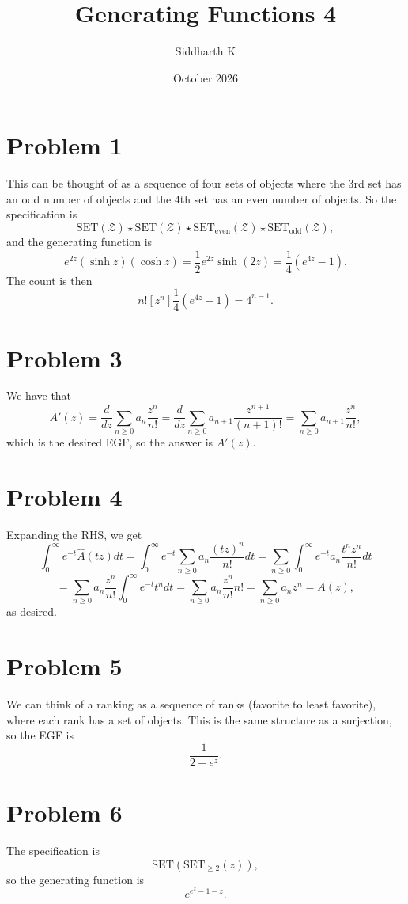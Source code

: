 \documentclass{article}
\title{Generating Functions 4}
\author{Siddharth K}
\date{October 2026}
\newcommand{\mcZ}{\mathcal{Z}}
\newcommand{\set}{\mathrm{SET}}
\begin{document}
\maketitle

\section*{Problem 1}
This can be thought of as a sequence of four sets of objects where the 3rd set has an odd number of objects and the 4th set has an even number of objects. So the specification is
$$\set(\mcZ) \star \set(\mcZ) \star \set_{\text{even}}(\mcZ) \star \set_{\text{odd}}(\mcZ),$$
and the generating function is
$$e^{2z}(\sinh z)(\cosh z) = \frac{1}{2}e^{2z}\sinh(2z) = \frac{1}{4}(e^{4z} - 1).$$
The count is then
$$n![z^n]\frac{1}{4}(e^{4z} - 1) = 4^{n - 1}.$$

\section*{Problem 3}
We have that
$$A'(z) = \frac{d}{dz}\sum_{n \ge 0}a_n \frac{z^n}{n!} = \frac{d}{dz} \sum_{n \ge 0} a_{n + 1} \frac{z^{n + 1}}{(n + 1)!} = \sum_{n \ge 0} a_{n + 1} \frac{z^n}{n!},$$
which is the desired EGF, so the answer is $A'(z)$.

\section*{Problem 4}
Expanding the RHS, we get
$$\int_0^\infty e^{-t}\widehat{A}(tz)dt = \int_0^\infty e^{-t} \sum_{n \ge 0} a_n \frac{(tz)^n}{n!} dt = \sum_{n \ge 0}\int_0^\infty e^{-t}a_n\frac{t^nz^n}{n!}dt$$
$$= \sum_{n \ge 0} a_n\frac{z^n}{n!}\int_0^\infty e^{-t}t^n dt = \sum_{n \ge 0} a_n\frac{z^n}{n!}n! = \sum_{n \ge 0} a_nz^n = A(z),$$
as desired.

\section*{Problem 5}
We can think of a ranking as a sequence of ranks (favorite to least favorite), where each rank has a set of objects. This is the same structure as a surjection, so the EGF is
$$\frac{1}{2 - e^z}.$$

\section*{Problem 6}
The specification is
$$\set(\set_{\ge 2}(z)),$$
so the generating function is
$$e^{e^z - 1 - z}.$$
\end{document}
